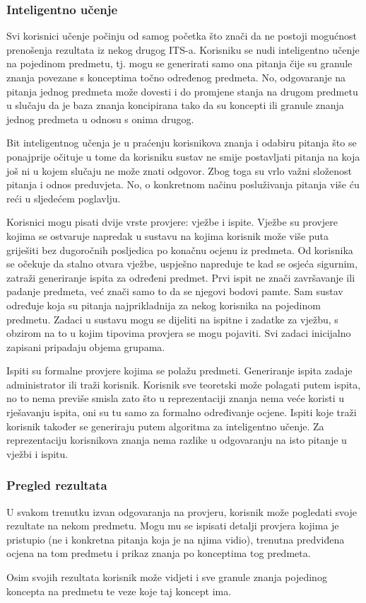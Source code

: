 \documentclass[times, utf8, zavrsni, numeric]{fer}
\begin{document}
\subsubsection{Inteligentno učenje}
Svi korisnici učenje počinju od samog početka što znači da ne postoji mogućnost prenošenja rezultata iz nekog drugog ITS-a. Korisniku se nudi inteligentno učenje na pojedinom predmetu, tj. mogu se generirati samo ona pitanja čije su granule znanja povezane s konceptima točno određenog predmeta. No, odgovaranje na pitanja jednog predmeta može dovesti i do promjene stanja na drugom predmetu u slučaju da je baza znanja koncipirana tako da su koncepti ili granule znanja jednog predmeta u odnosu s onima drugog.
\par
Bit inteligentnog učenja je u praćenju korisnikova znanja i odabiru pitanja što se ponajprije očituje u tome da korisniku sustav ne smije postavljati pitanja na koja još ni u kojem slučaju ne može  znati odgovor. Zbog toga su vrlo važni složenost pitanja i odnos preduvjeta. No, o konkretnom načinu posluživanja pitanja više ću reći u sljedećem poglavlju.
\par
Korisnici mogu pisati dvije vrste provjere: vježbe i ispite. Vježbe su provjere kojima se ostvaruje napredak u sustavu na kojima korisnik može više puta griješiti bez dugoročnih posljedica po konačnu ocjenu iz predmeta. Od korisnika se očekuje da stalno otvara vježbe, uspješno napreduje te kad se osjeća sigurnim, zatraži generiranje ispita za određeni predmet. Prvi ispit ne znači završavanje ili padanje predmeta, već znači samo to da se njegovi bodovi pamte. Sam sustav određuje koja su pitanja najprikladnija za nekog korisnika na pojedinom predmetu. Zadaci u sustavu mogu se dijeliti na ispitne i zadatke za vježbu, s obzirom na to u kojim tipovima provjera se mogu pojaviti. Svi zadaci inicijalno zapisani pripadaju objema grupama.
\par
Ispiti su formalne provjere kojima se polažu predmeti. Generiranje ispita zadaje administrator ili traži korisnik. Korisnik sve teoretski može polagati putem ispita, no to nema previše smisla zato što u reprezentaciji znanja nema veće koristi u rješavanju ispita, oni su tu samo za formalno određivanje ocjene. Ispiti koje traži korisnik također se generiraju putem algoritma za inteligentno učenje. Za reprezentaciju korisnikova znanja nema razlike u odgovaranju na isto pitanje u vježbi i ispitu.

\subsubsection{Pregled rezultata}
U svakom trenutku izvan odgovaranja na provjeru, korisnik može pogledati svoje rezultate na nekom predmetu. Mogu mu se ispisati detalji provjera kojima je pristupio (ne i konkretna pitanja koja je na njima vidio), trenutna predviđena ocjena na tom predmetu i prikaz znanja po konceptima tog predmeta.
\par
Osim svojih rezultata korisnik može vidjeti i sve granule znanja pojedinog koncepta na predmetu te veze koje taj koncept ima.
\end{document}
